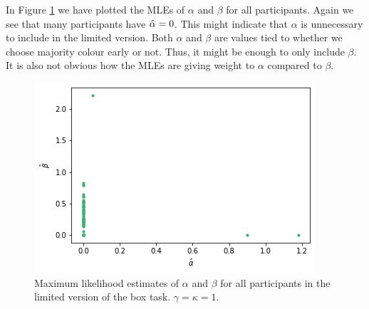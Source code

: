 In Figure \ref{fig:mles_limited_alpha_beta} we have plotted the MLEs of $\alpha$ and $\beta$ for all participants. Again we see that many participants have $\hat{\alpha}=0$. This might indicate that $\alpha$ is unnecessary to include in the limited version. Both $\alpha$ and $\beta$ are values tied to whether we choose majority colour early or not. Thus, it might be enough to only include $\beta$. It is also not obvious how the MLEs are giving weight to $\alpha$ compared to $\beta$. 
\begin{figure}
    \centering
    \includegraphics[scale=0.8]{pictures/plotted_mles_limited_alpha_beta_gk1.png}
    \caption[MLEs of $\alpha$ and $\beta$, limited. $\gamma=\kappa=1$]{Maximum likelihood estimates of $\alpha$ and $\beta$ for all participants in the limited version of the box task. $\gamma=\kappa=1$.}
    \label{fig:mles_limited_alpha_beta}
\end{figure}



